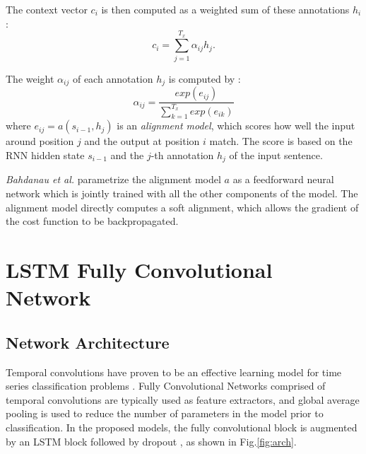 \documentclass[article]{IEEEtran}
\begin{document}
The context vector $c_i$ is then computed as a weighted sum of these annotations $h_i$:
\begin{equation}
    c_i = \sum_{j=1}^{T_x} \alpha_{ij}h_j.
\end{equation}

The weight $\alpha_{ij}$ of each annotation $h_j$ is computed by : 
\begin{equation}
    \alpha_{ij} = \frac{exp(e_{ij})}{\sum_{k=1}^{T_x} exp(e_{ik})}
\end{equation}
where $e_{ij} = a(s_{i-1}, h_j)$ is an \textit{alignment model}, which scores how well the input around position $j$ and the output at position $i$ match. The score is based on the RNN hidden state $s_{i−1}$ and the $j$-th annotation $h_j$ of the input sentence. 

\textit{Bahdanau et al.}\cite{bahdanau2014neural} parametrize the alignment model $a$ as a feedforward neural network which is jointly trained with all the other components of the model. The alignment model directly computes a soft alignment, which allows the gradient of the cost function to be backpropagated. %
 
\begin{figure*}
\center
{}
\center
\caption{The LSTM-FCN architecture. LSTM cells can be replaced by Attention LSTM cells to construct the ALSTM-FCN architecture.}
\label{fig:arch}

\end{figure*}

\section{LSTM Fully Convolutional Network}
\label{LSTMFCN}
\subsection{Network Architecture}



Temporal convolutions have proven to be an effective learning model for time series classification problems \cite{wang2017time}. Fully Convolutional Networks comprised of temporal convolutions are typically used as feature extractors, and global average pooling \cite{lin2013network} is used to reduce the number of parameters in the model prior to classification. In the proposed models, the fully convolutional block is augmented by an LSTM block followed by dropout \cite{srivastava2014dropout}, as shown in Fig.\ref{fig:arch}. 
\end{document}
